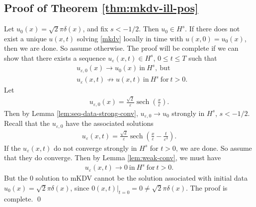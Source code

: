 \documentclass[12pt,reqno]{amsart}
\numberwithin{equation}{section}  %
\newcommand{\ee}{\varepsilon}
\DeclareMathOperator{\sech}{sech}
\begin{document}
        \subsection{Proof of Theorem \ref{thm:mkdv-ill-pos}} 
        \label{ssec:pf-thm}
        Let $u_{0}(x) = \sqrt{2} \pi \delta(x)$, and fix $s < -1/2$.
        Then $u_{0} \in H^{s}$. If there does not exist a unique $u(x,t)$
        solving \eqref{mkdv} locally in time with $u(x, 0) = u_{0}(x)$, then we
        are done. So assume otherwise. The proof will be complete if we can show
        that there exists a sequence $u_{\ee}(x,t) \in H^{s}$, $0 \le t \le T$
        such that
        \begin{equation*}
        \begin{split}
          & u_{\ee, 0}(x) \to u_{0}(x) \ \text{in} \ H^{s}, \ \text{but}
          \\
          & u_{\ee}(x,t) \not \to u(x,t) \ \text{in} \ H^{s} \ \text{for} \ t>0.
        \end{split}
        \end{equation*}
        Let 
        \begin{equation*}
        \begin{split}
          u_{\ee, 0}(x) = \frac{\sqrt{2}}{\ee} \sech\left( \frac{x}{\ee}
          \right). 
        \end{split}
        \end{equation*}
        Then by Lemma \ref{lem:seq-data-strong-conv}, $u_{\ee, 0} \to
        u_{0}$ strongly in $H^{s}$, $s < -1/2$. Recall that the $u_{\ee, 0}$ have
        the associated solutions
        \begin{equation*}
        \begin{split}
          u_{\ee}(x,t) = \frac{\sqrt{2}}{\ee} \sech\left( \frac{x}{ \ee} -
          \frac{t}{ \ee^{3}} \right).
        \end{split}
        \end{equation*}
        If the $u_{\ee}(x,t)$ do not converge strongly in $H^{s}$ for $t > 0$, we
        are done. So assume that they do converge. Then by Lemma
        \ref{lem:weak-conv}, we must have
        \begin{equation*}
        \begin{split}
          u_{\ee}(x,t) \to 0 \ \text{in} \ H^{s} \ \text{for} \ t > 0.
        \end{split}
        \end{equation*}
        But the $0$ solution to mKDV cannot be the solution associated with
        initial data $u_{0}(x) = \sqrt{2} \pi \delta(x)$, since $0(x,t)
        \vert_{t = 0} = 0 \neq \sqrt{2} \pi \delta(x)$. The proof is complete.
        \qed
        \appendix
\end{document}
